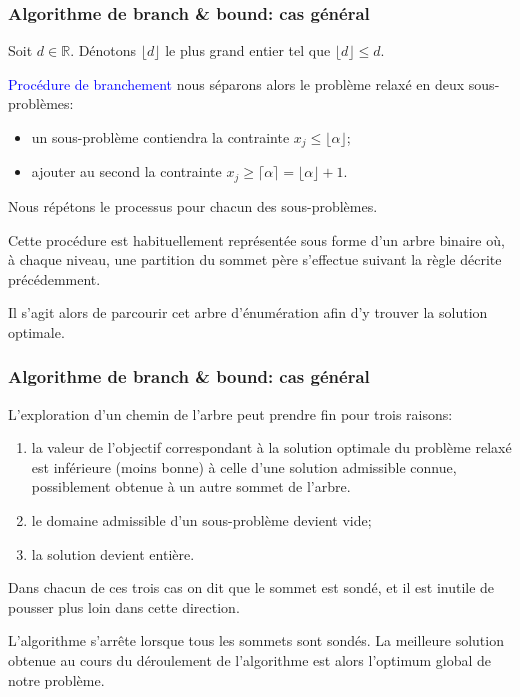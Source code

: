 \documentclass[usepdftitle=false]{beamer}
\begin{document}
\begin{frame}
\frametitle{Algorithme de branch \& bound: cas général}

Soit $d \in \mathbb{R}$. Dénotons $\lfloor d \rfloor$ le plus grand entier tel que $\lfloor d \rfloor \leq d$.

\mbox{}

\textcolor{blue}{Procédure de branchement} nous séparons alors le problème relaxé en deux sous-problèmes:
\begin{itemize}
	\item 
un sous-problème contiendra la contrainte $x_j \leq \lfloor \alpha \rfloor$;
\item
ajouter au second la contrainte $x_j \geq \lceil \alpha \rceil  = \lfloor \alpha \rfloor + 1$.
\end{itemize}
Nous répétons le processus pour chacun des sous-problèmes.

\mbox{}

Cette procédure est habituellement représentée sous forme
d'un arbre binaire où, à chaque niveau, une partition du sommet père s'effectue suivant la règle décrite précédemment.

\mbox{}

Il s'agit alors de parcourir cet arbre d'énumération afin d'y trouver la solution optimale.

\end{frame}

\begin{frame}
\frametitle{Algorithme de branch \& bound: cas général}

L'exploration d'un chemin de l'arbre peut prendre fin pour trois raisons:
\begin{enumerate}
\item
la valeur de l'objectif correspondant à la solution optimale du problème relaxé est inférieure (moins bonne) à celle d'une solution admissible connue, possiblement obtenue à un autre sommet de l'arbre.
\item
le domaine admissible d'un sous-problème devient vide;
\item
la solution devient entière.
\end{enumerate}
Dans chacun de ces trois cas on dit que le sommet est sondé, et il est inutile de pousser plus loin dans cette direction.

\mbox{}

L'algorithme s'arrête lorsque tous les sommets sont sondés.
La meilleure solution obtenue au cours du déroulement de l'algorithme est alors l'optimum global de notre problème.

\end{frame}
\end{document}
